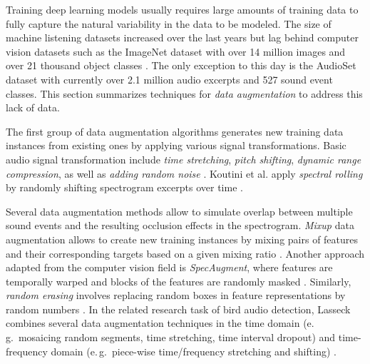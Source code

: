 \documentclass[applsci,article,submit,oneauthor,pdftex]{Definitions/mdpi}
\newcommand{\eg}{e.\,g.\ }
\begin{document}
Training deep learning models usually requires large amounts of training data to fully capture the natural variability in the data to be modeled.
The size of machine listening datasets increased over the last years but lag behind computer vision datasets such as the ImageNet dataset with over 14 million images and over 21 thousand object classes \citep{Russakovsky:2015:ImageNet:IJCV}.
The only exception to this day is the AudioSet dataset \citep{Gemmeke:2017:Audioset:ICASSP} with currently over 2.1 million audio excerpts and 527 sound event classes.
This section summarizes techniques for 
\textit{data augmentation} to address this 
lack of data.


The first group of data augmentation algorithms generates new training data instances from existing ones by applying various signal transformations.
Basic audio signal transformation include \textit{time stretching}, \textit{pitch shifting}, \textit{dynamic range compression}, as well as \textit{adding random noise} \citep{Abesser:2017:ASC:DCASE, Salamon:2017:ASC:SPL, Xu:2018:ASCMobileNet:ISM}. 
Koutini et al. apply \textit{spectral rolling} by randomly shifting spectrogram excerpts over time \citep{Koutini:2019:ReceptiveField:DCASE}.

Several data augmentation methods allow to simulate overlap between multiple sound events and the resulting occlusion effects in the spectrogram.
\textit{Mixup} data augmentation allows to create new training instances by mixing pairs of features and their corresponding targets based on a given mixing ratio \citep{Zhang:2018:Mixup:ICLR}. 
Another approach adapted from the computer vision field is \textit{SpecAugment}, where features are temporally warped and blocks of the features are randomly masked \citep{Park:2019:SpecAugment:INTERSPEECH}.
Similarly, \textit{random erasing} involves replacing random boxes in feature representations by random numbers \citep{Zhong:2017:RandomErasing:ARXIV}. 
In the related research task of bird audio detection, Lasseck combines several data augmentation techniques in the time domain (\eg mosaicing random segments, time stretching, time interval dropout) and time-frequency domain (\eg piece-wise time/frequency stretching and shifting) \citep{Lassseck:2018:Bird:DCASE}.
\end{document}
